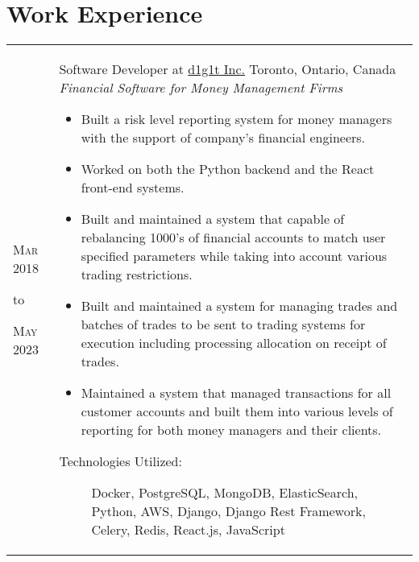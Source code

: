 \documentclass[a4paper,10pt]{article}
\begin{document}
        \section{Work Experience}
        \begin{tabular}{ R{1.5cm} | p{10.5cm} }
            \hfill \textsc{Mar 2018}\newline \begin{center} to \end{center} \hfill \textsc{May 2023} &
            Software Developer at \href{https://www.d1g1t.com/}{d1g1t Inc.}\newline
            Toronto, Ontario, Canada\newline
            \emph{Financial Software for Money Management Firms} \newline
            \fontsize{9pt}{10pt}\selectfont
            \begin{itemize}
                \item Built a risk level reporting system for money managers with the support of company's financial engineers.
                \item Worked on both the Python backend and the React front-end systems.
                \item Built and maintained a system that capable of rebalancing 1000's of financial accounts to match user specified parameters while taking into account various trading restrictions.
                \item Built and maintained a system for managing trades and batches of trades to be sent to trading systems for execution including processing allocation on receipt of trades.
                \item Maintained a system that managed transactions for all customer accounts and built them into various levels of reporting for both money managers and their clients.
            \end{itemize}
            \bigskip
            \begin{description}
                \item[Technologies Utilized:]
                Docker, PostgreSQL, MongoDB, ElasticSearch, Python, AWS, Django, Django Rest Framework, Celery, Redis, React.js, JavaScript
            \end{description}
        \end{tabular}
\end{document}
